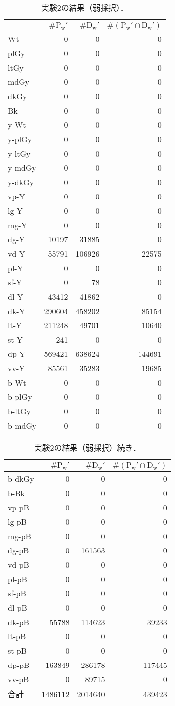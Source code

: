 \documentclass[uplatex,paper=a4,fontsize=4.0truemm,jafontsize=4.0truemm,head_space=30.0truemm,foot_space=30.0truemm,baselineskip=8.0truemm,line_length=40zw,gutter=25.0truemm,oneside,openany,fleqn,hanging_panctuation,open_bracket_pos=nibu_tentsuki,dvipdfmx,jis2004,book,titlepage]{jlreq}
\theoremstyle{mystyle}
\newcommand{\zwspace}{\hspace{1zw}\relax}
\newcommand{\captiondot}[1]{\caption{#1．}}
\newcommand{\tableinput}[4]{\begin{table}[tbp]\centering\captiondot{#3}\label{tab:#4}\begin{tabular}{#1}#2\end{tabular}\end{table}}
\newcommand{\parentheses}[1]{\left(#1\right)}
\begin{document}
			\tableinput{l|rrr}{ & \(\#\textrm{P}_\textrm{w}'\) & \(\#\textrm{D}_\textrm{w}'\) & \(\#\parentheses{\textrm{P}_\textrm{w}'\cap\textrm{D}_\textrm{w}'}\) \\ \hline
				Wt & 0 & 0 & 0 \\
				plGy & 0 & 0 & 0 \\
				ltGy & 0 & 0 & 0 \\
				mdGy & 0 & 0 & 0 \\
				dkGy & 0 & 0 & 0 \\
				Bk & 0 & 0 & 0 \\
				y-Wt & 0 & 0 & 0 \\
				y-plGy & 0 & 0 & 0 \\
				y-ltGy & 0 & 0 & 0 \\
				y-mdGy & 0 & 0 & 0 \\
				y-dkGy & 0 & 0 & 0 \\
				vp-Y & 0 & 0 & 0 \\
				lg-Y & 0 & 0 & 0 \\
				mg-Y & 0 & 0 & 0 \\
				dg-Y & 10197 & 31885 & 0 \\
				vd-Y & 55791 & 106926 & 22575 \\
				pl-Y & 0 & 0 & 0 \\
				sf-Y & 0 & 78 & 0 \\
				dl-Y & 43412 & 41862 & 0 \\
				dk-Y & 290604 & 458202 & 85154 \\
				lt-Y & 211248 & 49701 & 10640 \\
				st-Y & 241 & 0 & 0 \\
				dp-Y & 569421 & 638624 & 144691 \\
				vv-Y & 85561 & 35283 & 19685 \\
				b-Wt & 0 & 0 & 0 \\
				b-plGy & 0 & 0 & 0 \\
				b-ltGy & 0 & 0 & 0 \\
				b-mdGy & 0 & 0 & 0}{実験2の結果（弱採択）}{result23}
			\tableinput{l|rrr}{ & \(\#\textrm{P}_\textrm{w}'\) & \(\#\textrm{D}_\textrm{w}'\) & \(\#\parentheses{\textrm{P}_\textrm{w}'\cap\textrm{D}_\textrm{w}'}\) \\ \hline
				b-dkGy & 0 & 0 & 0 \\
				b-Bk & 0 & 0 & 0 \\
				vp-pB & 0 & 0 & 0 \\
				lg-pB & 0 & 0 & 0 \\
				mg-pB & 0 & 0 & 0 \\
				dg-pB & 0 & 161563 & 0 \\
				vd-pB & 0 & 0 & 0 \\
				pl-pB & 0 & 0 & 0 \\
				sf-pB & 0 & 0 & 0 \\
				dl-pB & 0 & 0 & 0 \\
				dk-pB & 55788 & 114623 & 39233 \\
				lt-pB & 0 & 0 & 0 \\
				st-pB & 0 & 0 & 0 \\
				dp-pB & 163849 & 286178 & 117445 \\
				vv-pB & 0 & 89715 & 0 \\ \hline
				合計 & 1486112 & 2014640 & 439423}{実験2の結果（弱採択）\zwspace 続き}{result25}
\end{document}
